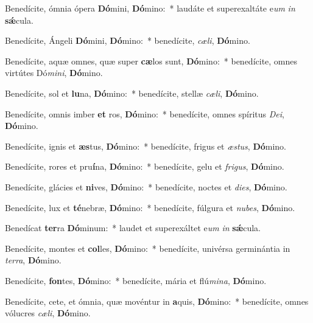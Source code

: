 \item Benedícite, ómnia ópera \textbf{Dó}mini, \textbf{Dó}mino:~* laudáte et superexaltáte e\textit{um} \textit{in} \textbf{sǽ}cula.

\item Benedícite, Ángeli \textbf{Dó}mini, \textbf{Dó}mino:~* benedícite, \textit{cæli}, \textbf{Dó}mino.

\item Benedícite, aquæ omnes, quæ super \textbf{cæ}los sunt, \textbf{Dó}mino:~* benedícite, omnes virtútes Dó\textit{mini}, \textbf{Dó}mino.

\item Benedícite, sol et \textbf{lu}na, \textbf{Dó}mino:~* benedícite, stellæ \textit{cæli}, \textbf{Dó}mino.

\item Benedícite, omnis imber \textbf{et} ros, \textbf{Dó}mino:~* benedícite, omnes spíritus \textit{Dei}, \textbf{Dó}mino.

\item Benedícite, ignis et \textbf{æs}tus, \textbf{Dó}mino:~* benedícite, frigus et \textit{æstus}, \textbf{Dó}mino.

\item Benedícite, rores et pru\textbf{í}na, \textbf{Dó}mino:~* benedícite, gelu et \textit{frigus}, \textbf{Dó}mino.

\item Benedícite, glácies et \textbf{ni}ves, \textbf{Dó}mino:~* benedícite, noctes et \textit{dies}, \textbf{Dó}mino.

\item Benedícite, lux et \textbf{té}nebræ, \textbf{Dó}mino:~* benedícite, fúlgura et \textit{nubes}, \textbf{Dó}mino.

\item Benedícat \textbf{ter}ra \textbf{Dó}minum:~* laudet et superexáltet e\textit{um} \textit{in} \textbf{sǽ}cula.

\item Benedícite, montes et \textbf{col}les, \textbf{Dó}mino:~* benedícite, univérsa germinántia in \textit{terra}, \textbf{Dó}mino.

\item Benedícite, \textbf{fon}tes, \textbf{Dó}mino:~* benedícite, mária et flú\textit{mina}, \textbf{Dó}mino.

\item Benedícite, cete, et ómnia, quæ movéntur in \textbf{a}quis, \textbf{Dó}mino:~* benedícite, omnes vólucres \textit{cæli}, \textbf{Dó}mino.

